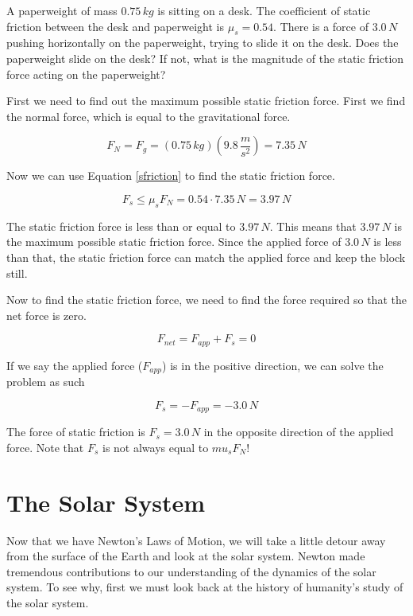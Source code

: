 \documentclass[12pt]{book}
\begin{document}
\begin{exampleblock}

A paperweight of mass $0.75 \, kg$ is sitting on a desk. The coefficient of static friction between the desk and paperweight is $\mu_s = 0.54$. There is a force of $3.0 \, N$ pushing horizontally on the paperweight, trying to slide it on the desk. Does the paperweight slide on the desk? If not, what is the magnitude of the static friction force acting on the paperweight?

\hspace{10pt}

First we need to find out the maximum possible static friction force. First we find the normal force, which is equal to the gravitational force.

\begin{equation}
F_N = F_g = (0.75 \, kg) (9.8 \, \frac{m}{s^2}) = 7.35 \, N
\end{equation}

Now we can use Equation \ref{sfriction} to find the static friction force.

\begin{equation}
F_s \leq \mu_s F_N = 0.54 \cdot 7.35 \, N = 3.97 \, N
\end{equation}

The static friction force is less than or equal to $3.97 \, N$. This means that $3.97 \, N$ is the maximum possible static friction force. Since the applied force of $3.0 \, N$ is less than that, the static friction force can match the applied force and keep the block still.

Now to find the static friction force, we need to find the force required so that the net force is zero. 

\begin{equation}
F_{net} = F_{app} + F_s = 0
\end{equation}

If we say the applied force ($F_{app}$) is in the positive direction, we can solve the problem as such

\begin{equation}
F_s = -F_{app} = - 3.0 \, N
\end{equation}

The force of static friction is $F_s = 3.0 \, N$ in the opposite direction of the applied force. Note that $F_s$ is not always equal to $mu_s F_N$!

\end{exampleblock}

\chapter{The Solar System}
Now that we have Newton's Laws of Motion, we will take a little detour away from the surface of the Earth and look at the solar system. Newton made tremendous contributions to our understanding of the dynamics of the solar system. To see why, first we must look back at the history of humanity's study of the solar system.
\end{document}
